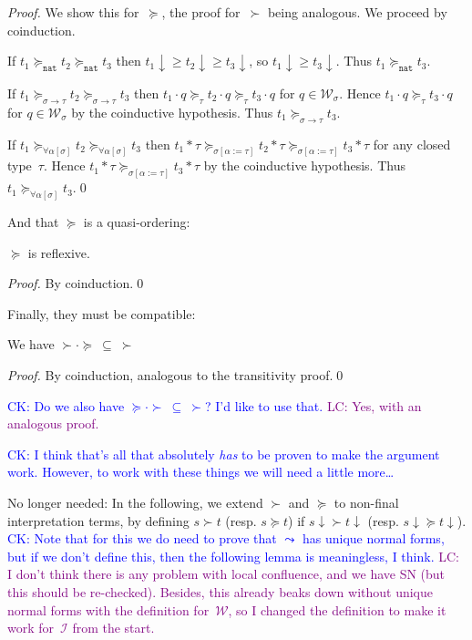 \documentclass[runningheads,a4paper]{llncs}
\newcommand{\Iterms}{\mathcal{I}}
\newcommand{\World}{\mathcal{W}}
\newcommand{\arrtype}{\rightarrow}
\newcommand{\app}[2]{#1 \cdot #2}
\newcommand{\tapp}[2]{#1 * #2}
\newcommand{\subst}[2]{#1:=#2}
\newcommand{\nat}{\mathtt{nat}}
\newcommand{\da}{\downarrow}
\newcommand{\CK}[1]{\textcolor{blue}{CK: #1}}
\newcommand{\LC}[1]{\textcolor{purple}{LC: #1}}
\begin{document}
\begin{proof}
  We show this for~$\succeq$, the proof for~$\succ$ being
  analogous. We proceed by coinduction.

  If $t_1 \succeq_\nat t_2 \succeq_\nat t_3$ then
  $t_1\da \ge t_2\da \ge t_3\da$, so $t_1\da \ge t_3\da$. Thus
  $t_1 \succeq_\nat t_3$.

  If $t_1 \succeq_{\sigma\arrtype\tau}t_2\succeq_{\sigma\arrtype\tau}t_3$ then
  $\app{t_1}{q}\succeq_{\tau}\app{t_2}{q}\succeq_\tau\app{t_3}{q}$ for
  $q \in \World_\sigma$. Hence $\app{t_1}{q}\succeq_\tau\app{t_3}{q}$
  for $q \in \World_\sigma$ by the coinductive hypothesis. Thus
  $t_1\succeq_{\sigma\arrtype\tau} t_3$.

  If $t_1
  \succeq_{\forall\alpha[\sigma]}t_2\succeq_{\forall\alpha[\sigma]}t_3$
  then
  $\tapp{t_1}{\tau}\succeq_{\sigma[\subst{\alpha}{\tau}]}\tapp{t_2}{\tau}\succeq_{\sigma[\subst{\alpha}{\tau}]}\tapp{t_3}{\tau}$
  for any closed type~$\tau$. Hence
  $\tapp{t_1}{\tau}\succeq_{\sigma[\subst{\alpha}{\tau}]}\tapp{t_3}{\tau}$
  by the coinductive hypothesis. Thus
  $t_1\succeq_{\forall\alpha[\sigma]} t_3$.\qed
\end{proof}

And that $\succeq$ is a quasi-ordering:

\begin{lemma}
$\succeq$ is reflexive.
\end{lemma}

\begin{proof}
  By coinduction.\qed
\end{proof}

Finally, they must be compatible:

\begin{lemma}\label{lem:compatibility}
We have $\succ \cdot \succeq\ \subseteq\ \succ$
\end{lemma}

\begin{proof}
By coinduction, analogous to the transitivity proof.\qed
\end{proof}

\CK{Do we also have $\succeq \cdot \succ\ \subseteq\ \succ$? I'd like
to use that.\medskip} \LC{Yes, with an analogous proof.}

\CK{I think that's all that absolutely \emph{has} to be proven to make
  the argument work. However, to work with these things we will need a
  little more\dots}

No longer needed: In the following, we extend $\succ$ and $\succeq$ to
non-final interpretation terms, by defining $s \succ t$ (resp. $s
\succeq t$) if $s\downarrow \succ t\da$ (resp. $s\downarrow \succeq
t\downarrow$).  \CK{Note that for this we do need to prove that
  $\leadsto$ has unique normal forms, but if we don't define this,
  then the following lemma is meaningless, I think.}  \LC{I don't
  think there is any problem with local confluence, and we have SN
  (but this should be re-checked). Besides, this already beaks down
  without unique normal forms with the definition for~$\World$, so I
  changed the definition to make it work for~$\Iterms$ from the
  start.}
\end{document}
